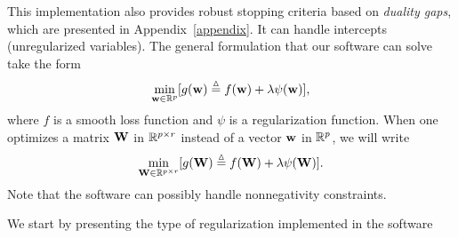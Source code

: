 \documentclass[a4paper, 11pt]{article}
\begin{document}
This implementation also provides robust stopping criteria based on
\emph{duality gaps}, which are presented in Appendix~\ref{appendix}.  It can handle intercepts (unregularized variables).   The general formulation that our software
can solve take the form
\begin{displaymath}
\min_{{\mathbf w} \in {\mathbb R}^p} [g({\mathbf w}) \stackrel{\vartriangle}{=} f({\mathbf w}) + \lambda\psi({\mathbf w})],
\end{displaymath}
where $f$ is a smooth loss function and $\psi$ is a regularization function.
When one optimizes a matrix ${\mathbf W}$ in ${\mathbb R}^{p \times r}$ instead of
a vector ${\mathbf w}$ in ${\mathbb R}^p$, we will write 
\begin{displaymath}
\min_{{\mathbf W} \in {\mathbb R}^{p \times r}} [g({\mathbf W}) \stackrel{\vartriangle}{=} f({\mathbf W}) + \lambda\psi({\mathbf W})].
\end{displaymath}
Note that the software can possibly handle nonnegativity constraints.

We start by presenting the type of regularization implemented in the software
\end{document}
